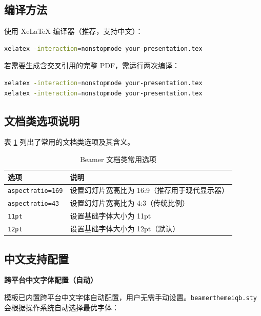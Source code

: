 \subsection{编译方法}

使用 XeLaTeX 编译器（推荐，支持中文）：

\begin{lstlisting}[style=blockstyle,language=bash]
xelatex -interaction=nonstopmode your-presentation.tex
\end{lstlisting}

若需要生成含交叉引用的完整 PDF，需运行两次编译：

\begin{lstlisting}[style=blockstyle,language=bash]
xelatex -interaction=nonstopmode your-presentation.tex
xelatex -interaction=nonstopmode your-presentation.tex
\end{lstlisting}

\subsection{文档类选项说明}

表 \ref{tab:documentclass-options} 列出了常用的文档类选项及其含义。

\begin{table}[!h]
\centering
\caption{Beamer 文档类常用选项}
\label{tab:documentclass-options}
\begin{tabular}{p{3.5cm}p{9.5cm}}
\toprule
\textbf{选项} & \textbf{说明} \\
\midrule
\lstinline|aspectratio=169| & 设置幻灯片宽高比为 16:9（推荐用于现代显示器） \\
\lstinline|aspectratio=43| & 设置幻灯片宽高比为 4:3（传统比例） \\
\lstinline|11pt| & 设置基础字体大小为 11pt \\
\lstinline|12pt| & 设置基础字体大小为 12pt（默认） \\
\bottomrule
\end{tabular}
\end{table}

\subsection{中文支持配置}

\textbf{跨平台中文字体配置（自动）}

模板已内置跨平台中文字体自动配置，用户无需手动设置。\lstinline|beamerthemeiqb.sty| 会根据操作系统自动选择最优字体：

